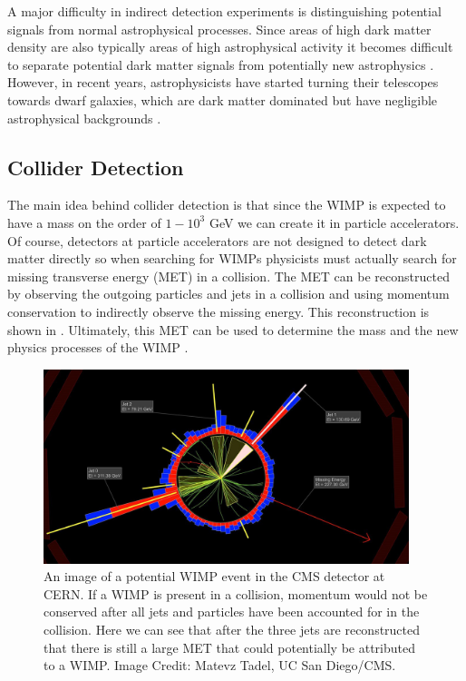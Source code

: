 A major difficulty in indirect detection experiments is distinguishing potential signals from normal astrophysical processes.  Since areas of high dark matter density are also typically areas of high astrophysical activity it becomes difficult to separate potential dark matter signals from potentially new astrophysics \cite{zitzer2015search}.  However, in recent years, astrophysicists have started turning their telescopes towards dwarf galaxies, which are dark matter dominated but have negligible astrophysical backgrounds \cite{conrad2014indirect}.  %



\subsection{Collider Detection}

The main idea behind collider detection is that since the WIMP is expected to have a mass on the order of $1-10^3$ GeV we can create it in particle accelerators.  Of course, detectors at particle accelerators are not designed to detect dark matter directly so when searching for WIMPs physicists must actually search for missing transverse energy (MET) in a collision.  The MET can be reconstructed by observing the outgoing particles and jets in a collision and using momentum conservation to indirectly observe the missing energy.  This reconstruction is shown in .  Ultimately, this MET can be used to determine the mass and the new physics processes of the WIMP \cite{bi2013status}.

\begin{figure}[b]
	\centering
	\includegraphics[width=0.95\textwidth]{collider_detection_cms}
	\caption{An image of a potential WIMP event in the CMS detector at CERN.  If a WIMP is present in a collision, momentum would not be conserved after all jets and particles have been accounted for in the collision.  Here we can see that after the three jets are reconstructed that there is still a large MET that could potentially be attributed to a WIMP.  Image Credit: Matevz Tadel, UC San Diego/CMS.}
	\label{fig:collider_detection}
\end{figure}


